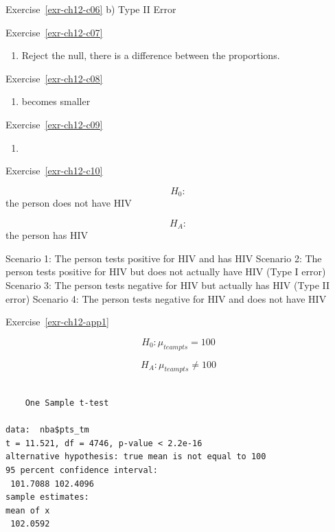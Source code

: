 \documentclass[
  letterpaper,
  DIV=11,
  numbers=noendperiod]{scrreprt}
\newenvironment{Shaded}{\begin{snugshade}}{\end{snugshade}}
\newcommand{\AttributeTok}[1]{\textcolor[rgb]{0.40,0.45,0.13}{#1}}
\newcommand{\DecValTok}[1]{\textcolor[rgb]{0.68,0.00,0.00}{#1}}
\newcommand{\FunctionTok}[1]{\textcolor[rgb]{0.28,0.35,0.67}{#1}}
\newcommand{\NormalTok}[1]{\textcolor[rgb]{0.00,0.23,0.31}{#1}}
\newcommand{\SpecialCharTok}[1]{\textcolor[rgb]{0.37,0.37,0.37}{#1}}
\providecommand{\tightlist}{%
  \setlength{\itemsep}{0pt}\setlength{\parskip}{0pt}}\usepackage{longtable,booktabs,array}
\theoremstyle{definition}
\theoremstyle{remark}
\begin{document}
Exercise~\ref{exr-ch12-c06} b) Type II Error

Exercise~\ref{exr-ch12-c07}

\begin{enumerate}
\def\labelenumi{\alph{enumi})}
\setcounter{enumi}{3}
\tightlist
\item
  Reject the null, there is a difference between the proportions.
\end{enumerate}

Exercise~\ref{exr-ch12-c08}

\begin{enumerate}
\def\labelenumi{\alph{enumi})}
\setcounter{enumi}{1}
\tightlist
\item
  becomes smaller
\end{enumerate}

Exercise~\ref{exr-ch12-c09}

\begin{enumerate}
\def\labelenumi{\alph{enumi})}
\setcounter{enumi}{2}
\tightlist
\item
\end{enumerate}

Exercise~\ref{exr-ch12-c10}

\[H_0:\] the person does not have HIV

\[H_A:\] the person has HIV

Scenario 1: The person tests positive for HIV and has HIV Scenario 2:
The person tests positive for HIV but does not actually have HIV (Type I
error) Scenario 3: The person tests negative for HIV but actually has
HIV (Type II error) Scenario 4: The person tests negative for HIV and
does not have HIV

Exercise~\ref{exr-ch12-app1}

\[H_0: \mu_{team pts} = 100\]

\[H_A: \mu_{team pts} \ne 100\]

\begin{Shaded}
\end{Shaded}

\begin{verbatim}

    One Sample t-test

data:  nba$pts_tm
t = 11.521, df = 4746, p-value < 2.2e-16
alternative hypothesis: true mean is not equal to 100
95 percent confidence interval:
 101.7088 102.4096
sample estimates:
mean of x 
 102.0592 
\end{verbatim}
\end{document}
